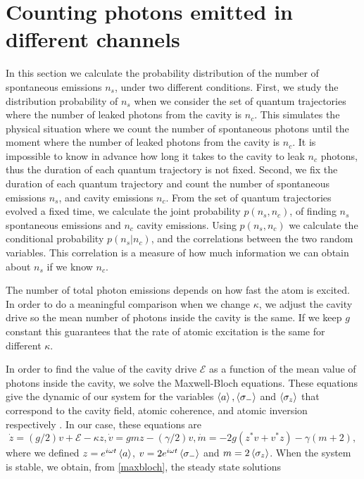 \documentclass[epj,final]{svjour}
\begin{document}
\section{Counting photons emitted in different channels}\label{sc:distributions}
In this section we calculate the probability distribution of the
number of spontaneous emissions $n_s$, under two different conditions.
First, we study the distribution probability of $n_s$ when we consider
the set of quantum trajectories where the number of leaked photons
from the cavity is $n_c$. This simulates the physical situation where
we count the number of spontaneous photons until the moment where the
number of leaked photons from the cavity is $n_c$. It is impossible to
know in advance how long it takes to the cavity to leak $n_c$ photons,
thus the duration of each quantum trajectory is not fixed. Second, we
fix the duration of each quantum trajectory and count the number of
spontaneous emissions $n_s$, and cavity emissions $n_c$. From the set
of quantum trajectories evolved a fixed time, we calculate the joint
probability $p(n_s,n_c)$, of finding $n_s$ spontaneous emissions and
$n_c$ cavity emissions. Using $p(n_s,n_c)$ we calculate the
conditional probability $p(n_s|n_c)$, and the correlations between the
two random variables. This correlation is a measure of how much
information we can obtain about $n_s$ if we know $n_c$.

The number of total photon emissions depends on how fast the atom is
excited. In order to do a meaningful comparison when we change
$\kappa$, we adjust the cavity drive so the mean number of photons
inside the cavity is the same. If we keep $g$ constant this guarantees
that the rate of atomic excitation is the same for different $\kappa$.

In order to find the value of the cavity drive $\mathcal{E}$ as a
function of the mean value of photons inside the cavity, we solve the
Maxwell-Bloch equations. These equations give the dynamic of our
system for the variables $\expval{a}, \expval{\sigma_-}$ and
$\expval{\sigma_z}$ that correspond to the cavity field, atomic
coherence, and atomic inversion respectively \cite{Alsing_1991}. In
our case, these equations are
\begin{subequations} \label{maxbloch}
\begin{equation} \label{bloch1}
\dot{z} = (g/2)v + \mathcal{E} - \kappa z,
\end{equation}
\begin{equation} \label{bloch2}
\dot{v} = gmz - (\gamma/2)v,
\end{equation}
\begin{equation} \label{bloch3}
\dot{m} = -2g(z^*v + v^*z) - \gamma(m + 2),
\end{equation}
\end{subequations} 
where we defined $z = e^{i\omega t}\expval{a}$,
$v = 2e^{i\omega t}\expval{\sigma_-}$ and $m = 2\expval{\sigma_z}$.
When the system is stable, we obtain, from
\eqref{maxbloch}, the steady state
solutions \cite{gagniuc2017markov}
\end{document}
